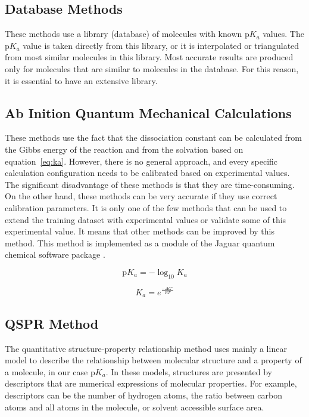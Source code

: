 \subsection{Database Methods}

These methods \cite{Sayle, Blower2006} use a library (database) of molecules
with known p$K_a$ values. The p$K_a$ value is taken directly from this library, or 
it is interpolated or triangulated from most similar molecules in this library.
Most accurate results are produced only for molecules that are similar to
molecules in the database. For this reason, it is essential to have
an extensive library.

\subsection{Ab Inition Quantum Mechanical Calculations}

These methods \cite{Liptak2002, Toth2001} use the fact that the dissociation 
constant can be calculated from the Gibbs energy of the reaction and from the
solvation based on equation~\ref{eq:ka}. However, there is no general approach,
and every specific calculation configuration needs to be calibrated based on
experimental values. The significant disadvantage of these methods is that they
are time-consuming. On the other hand, these methods can be very accurate if
they use correct calibration parameters. It is only one of the few methods that
can be used to extend the training dataset with experimental values or validate
some of this experimental value. It means that other methods can be improved
by this method. This method is implemented as a module of the Jaguar quantum
chemical software package \cite{jaguar}.

\begin{equation}
    \mathrm{p}K_a = - \log_{10} K_a
\end{equation}

\begin{equation} \label{eq:ka}
    K_a = e^{\frac{-\Delta G^\circ}{RT}}
\end{equation}

\subsection{QSPR Method}

The quantitative structure-property relationship method \cite{Dixon1993,
Zhang2006, Jelfs2007} uses mainly
a linear model to describe the relationship between molecular structure and
a property of a molecule, in our case p$K_a$. In these models, structures are
presented by descriptors \cite{Todoschini2009} that are numerical expressions of molecular
properties. For example, descriptors can be the number of hydrogen atoms, the 
ratio between carbon atoms and all atoms in the molecule, or solvent accessible
surface area.

